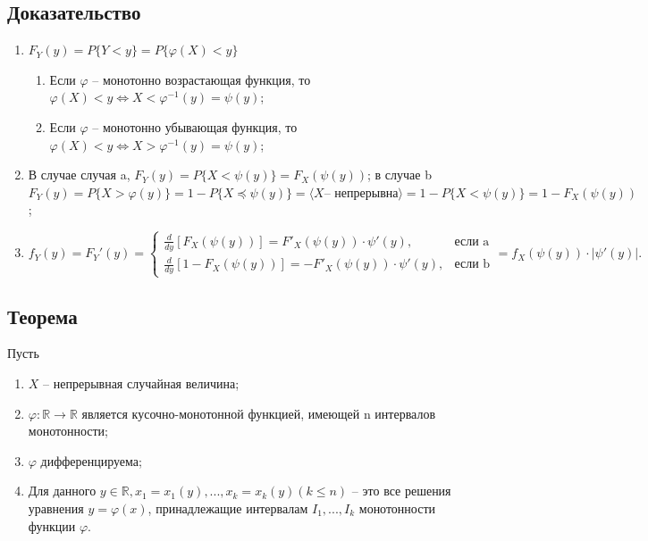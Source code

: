 \subsection*{Доказательство}

\begin{enumerate}
	\item $F_Y(y) = P\{Y < y\} = P\{\varphi(X) < y\}$
	\begin{enumerate}
		\item Если $\varphi$ -- монотонно возрастающая функция, то $\varphi(X) < y \iff X < \varphi ^{-1}(y) = \psi(y)$;
		\item Если $\varphi$ -- монотонно убывающая функция, то $\varphi(X) < y \iff X > \varphi ^{-1}(y) = \psi(y)$;
	\end{enumerate}
	\item В случае случая a, $F_Y(y) = P\{X < \psi(y)\} = F_X(\psi(y))$; в случае b $F_Y(y) = P\{X > \varphi(y)\} = 1 - P\{X \preceq \psi(y)\} = \langle X \text{-- непрерывна} \rangle = 1 - P\{X < \psi(y)\} = 1 - F_X(\psi(y))$;
	\item 
	
	\[
	f_Y(y) = F_Y'(y) = 
	\begin{cases} 
		\frac{d}{dy} [F_X(\psi(y))] = F'_X(\psi(y)) \cdot \psi'(y), & \text{если a} \\
		\frac{d}{dy} [1 - F_X(\psi(y))] = -F'_X(\psi(y)) \cdot \psi'(y), & \text{если b}
	\end{cases}
	= f_X(\psi(y)) \cdot |\psi'(y)|.
	\]
	
\end{enumerate}

\subsection*{Теорема}

Пусть
\begin{enumerate}
	\item $X$ -- непрерывная случайная величина;
	\item $\varphi: \mathbb{R} \to \mathbb{R}$ является кусочно-монотонной функцией, имеющей n интервалов монотонности;
	\item $\varphi$ дифференцируема;
	\item Для данного $y \in \mathbb{R} , x_1 = x_1(y), ..., x_k = x_k(y) (k \leq n)$ -- это все решения уравнения $y = \varphi(x)$, принадлежащие интервалам $I_1, ..., I_k$ монотонности функции $\varphi$.
\end{enumerate}

